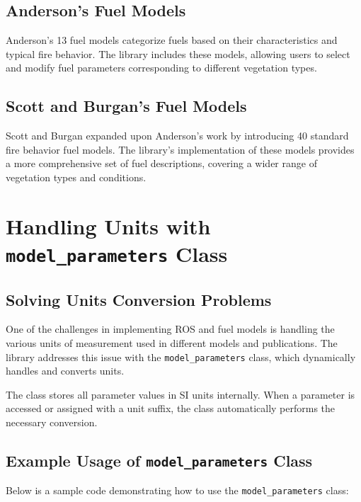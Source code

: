 \documentclass{article}
\begin{document}
	\subsection{Anderson's Fuel Models}
	Anderson's 13 fuel models categorize fuels based on their characteristics and typical fire behavior. The library includes these models, allowing users to select and modify fuel parameters corresponding to different vegetation types.
	
	\subsection{Scott and Burgan's Fuel Models}
	Scott and Burgan expanded upon Anderson's work by introducing 40 standard fire behavior fuel models. The library's implementation of these models provides a more comprehensive set of fuel descriptions, covering a wider range of vegetation types and conditions.
	
	\section{Handling Units with \texttt{model\_parameters} Class}
	\subsection{Solving Units Conversion Problems}
	One of the challenges in implementing ROS and fuel models is handling the various units of measurement used in different models and publications. The library addresses this issue with the \texttt{model\_parameters} class, which dynamically handles and converts units.
	
	The class stores all parameter values in SI units internally. When a parameter is accessed or assigned with a unit suffix, the class automatically performs the necessary conversion.
	
	\subsection{Example Usage of \texttt{model\_parameters} Class}
	Below is a sample code demonstrating how to use the \texttt{model\_parameters} class:
	
\end{document}
